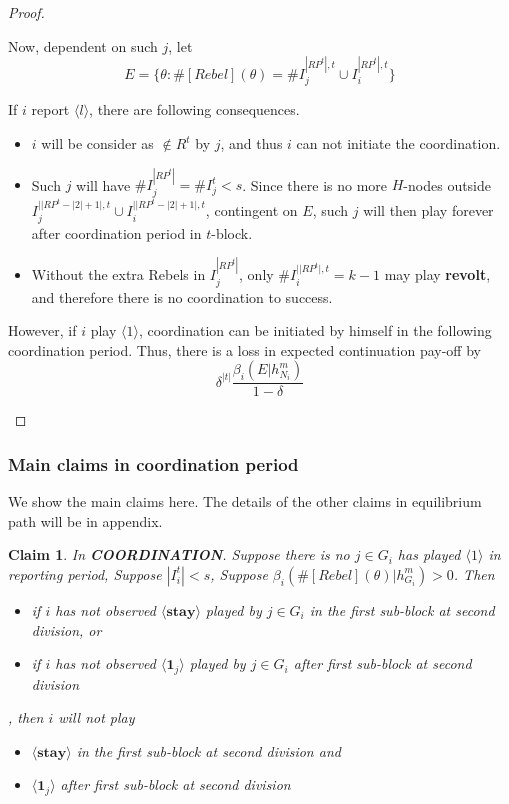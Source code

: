 \documentclass[12pt]{article}
\newtheorem{claim}{Claim}[subsubsection]
\theoremstyle{remark}
\theoremstyle{remark}
\begin{document}
\begin{proof}
\begin{itemize}
Now, dependent on such $j$, let
\[E=\{\theta:\#[Rebel](\theta)=\#I^{|RP^t|,t}_j\cup I^{|RP^t|,t}_i\}\]

If $i$ report $\langle l \rangle$, there are following consequences.

\begin{itemize}
\item $i$ will be consider as $\notin R^t$ by $j$, and thus $i$ can not initiate the coordination.
\item Such $j$ will have $\#I^{|RP^t|}_j=\#I^t_j<s$. Since there is no more $H$-nodes outside $I^{||RP^t-|2|+1|,t}_j\cup I^{||RP^t-|2|+1|,t}_i$, contingent on $E$, such $j$ will then play  forever after coordination period in $t$-block.
\item Without the extra Rebels in $I^{|RP^t|}_j$, only $\#I^{||RP^t|,t}_i= k-1$ may play \textbf{revolt}, and therefore there is no coordination to success. 
\end{itemize}

However, if $i$ play $\langle 1 \rangle$, coordination can be initiated by himself in the following coordination period. Thus, there is a loss in expected continuation pay-off by
\[\delta^{|t|}\frac{\beta_{i}(E|h^{m}_{N_i})}{1-\delta} \]
\end{itemize}

\end{proof}




\subsubsection{Main claims in coordination period}

We show the main claims here. The details of the other claims in equilibrium path will be in appendix.








\begin{claim} 
\label{claim_report_with_no_message_coordination_period}
In \textbf{COORDINATION}. Suppose there is no $j\in G_i$ has played $\langle 1 \rangle$ in reporting period, Suppose $|I^t_i|<s$, Suppose $\beta_{i}(\#[Rebel](\theta)|h^{m}_{G_i})>0$. Then 
\begin{itemize}
\item if $i$ has not observed $\langle \textbf{stay} \rangle$ played by $j\in G_i$ in the first sub-block at second division, or
\item if $i$ has not observed $\langle \mathbf{1}_j \rangle$ played by $j\in G_i$ after first sub-block at second division
\end{itemize}
, then $i$ will not play
\begin{itemize}
\item $\langle \textbf{stay} \rangle$  in the first sub-block at second division and
\item $\langle \mathbf{1}_j \rangle$  after first sub-block at second division
\end{itemize}
\end{claim}
\end{document}

